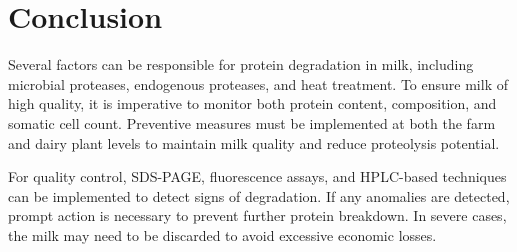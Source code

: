 \section{Conclusion}
Several factors can be responsible for protein degradation in milk, including microbial proteases, endogenous proteases, and heat treatment. To ensure milk of high quality, it is imperative to monitor both protein content, composition, and somatic cell count. Preventive measures must be implemented at both the farm and dairy plant levels to maintain milk quality and reduce proteolysis potential. 

For quality control, SDS-PAGE, fluorescence assays, and HPLC-based techniques can be implemented to detect signs of degradation. If any anomalies are detected, prompt action is necessary to prevent further protein breakdown. In severe cases, the milk may need to be discarded to avoid excessive economic losses.


